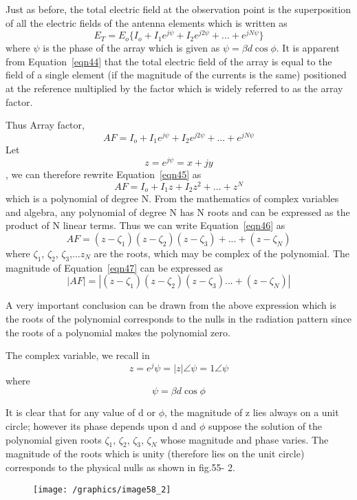 Just as before, the total electric field at the observation point is the superposition of all the electric fields of the antenna elements which is written as 
\begin{equation}
E_{T}=E_{o}\{I_{o}+I_{1}e^{j\psi}+I_{2}e^{j2\psi}+...+e^{jN\psi}\}
\label{eqn44}
\end{equation}
where $\psi$ is the phase of the array which is given as $\psi=\beta d\cos\phi$. It is apparent from Equation~\ref{eqn44} that the total electric field of the array is equal to the field of a single element (if the magnitude of the currents is the same) positioned at the reference multiplied by the factor which is widely referred to as the array factor. 

Thus Array factor,
\begin{equation}
AF=I_{o}+I_{1}e^{j\psi}+I_{2}e^{j2\psi}+...+e^{jN\psi}
\label{eqn45}
\end{equation}
 Let $$z=e^{j\psi}=x+jy$$, we can therefore rewrite Equation~\ref{eqn45} as
\begin{equation}
AF=I_{o}+I_{1}z+I_{2}z^{2}+...+z^N
\label{eqn46}
\end{equation}
which is a polynomial of degree N. From the mathematics of complex variables and algebra, any polynomial of degree N has N roots and can be expressed as the product of N linear terms. Thus we can write Equation~\ref{eqn46} as 
\begin{equation}
AF=(z-\zeta_1)(z-\zeta_2)(z-\zeta_3)+...+(z-\zeta_N)
\label{eqn47}
\end{equation}
where $\zeta_{1}$, $\zeta_{2}$, $\zeta_{3}$,...$z_{N}$ are the roots, which may be complex of the polynomial. The magnitude of Equation~\ref{eqn47} can be expressed as
\begin{equation}
|AF|=|(z-\zeta_1)(z-\zeta_2)(z-\zeta_3)...+(z-\zeta_N)|
\label{eqn48}
\end{equation}

A very important conclusion can be drawn from the above expression which is the roots of the polynomial corresponds to the nulls in the radiation pattern since the roots of a polynomial makes the polynomial zero.

The complex variable, we recall in 
$$z=e^j{\psi}=|z|\angle\psi = 1\angle\psi$$
where $$\psi=\beta d\cos\phi$$

It is clear that for any value of d or $\phi$, the magnitude of z lies always on a unit circle; however its phase depends upon d and $\phi$ suppose the solution of the polynomial given roots $\zeta_{1}$, $\zeta_{2}$, $\zeta_{3}$, $\zeta_{N}$ whose magnitude and phase varies. The magnitude of the roots which is unity (therefore lies on the unit circle) corresponds to the physical nulls as shown in fig.55- 2.
\begin{figure}[h]
\centering
\texttt{[image: /graphics/image58\_2]}
\caption{}
\label{fig:fig 55_2}
\end{figure}

